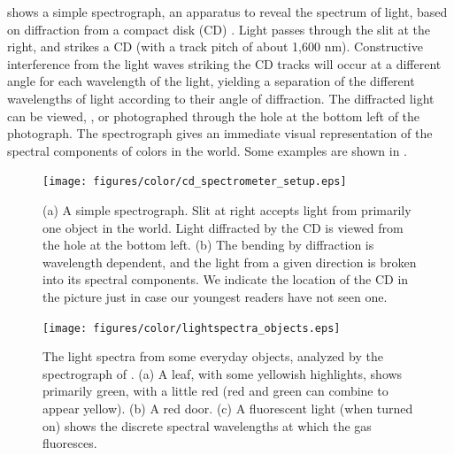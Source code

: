 shows a simple spectrograph, an apparatus to reveal the spectrum of light, based on
diffraction from a compact disk (CD) \cite{spectrometer}.  Light passes through the slit at
the right, and strikes a CD (with a track pitch of about 1,600 nm).
Constructive interference from the light waves striking the CD tracks
will occur at a different angle for each wavelength of the light, yielding
a separation of the different wavelengths of light according to their
angle of diffraction.  The diffracted 
light can be viewed,   , 
or photographed through the hole at the bottom
left of the photograph.  The spectrograph gives an immediate visual
representation of the spectral components of colors in the world. Some examples are shown in \fig{\ref{fig:examples1}}.



\begin{figure}[t]
\centerline{
\texttt{[image: figures/color/cd\_spectrometer\_setup.eps]}
}
\caption{(a) A simple spectrograph.
  Slit at right accepts light from primarily one object in the world.
  Light diffracted by the CD is viewed from the hole at the bottom
  left.  (b) The bending by diffraction is wavelength dependent, and the
  light from a given direction is broken into its spectral components. We indicate the location of the CD in the picture just in case our youngest readers have not seen one.}
\label{fig:colorWavelengths}
\end{figure}




\begin{figure}
\centerline{
\texttt{[image: figures/color/lightspectra\_objects.eps]}
}
\caption{The light spectra from some everyday objects, analyzed by the spectrograph of
  \fig{\ref{fig:colorWavelengths}}.  (a) A leaf, with some
  yellowish highlights, shows primarily green, with a little red (red
  and green can combine to appear yellow).  (b) A
  red door.  (c)  A fluorescent light (when turned on) shows the discrete spectral wavelengths at
  which the gas fluoresces.
}
\label{fig:examples1}
\end{figure} 


